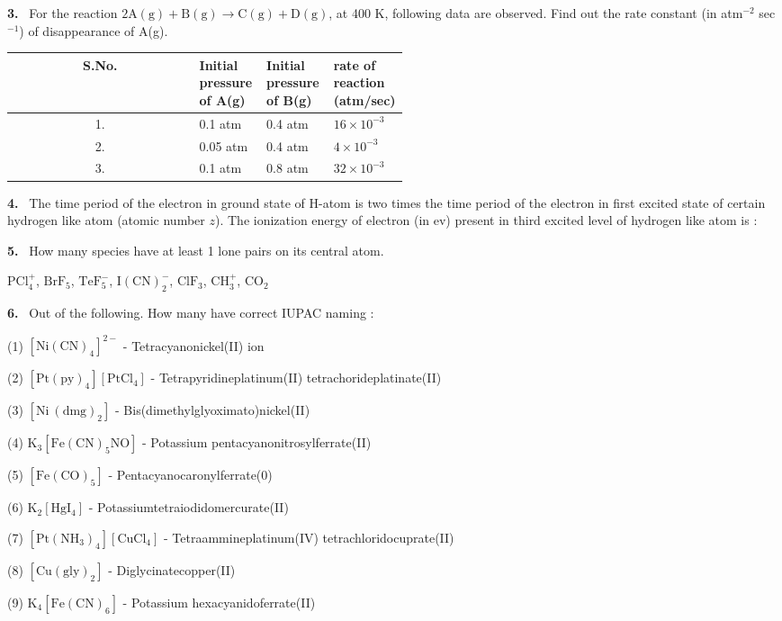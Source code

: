 \documentclass[10pt]{extarticle}
\newcommand{\qn}[1]{\par\smallskip\noindent\textbf{#1.}~}
\begin{document}
\begin{multicols}{2}
\qn{3} For the reaction $\mathrm{2A(g)+B(g)\longrightarrow C(g)+D(g)}$, at 400 K, following data are observed. Find out the rate constant (in atm$^{-2}$ sec$^{-1}$) of disappearance of A(g).\par
{\footnotesize\setlength{\tabcolsep}{3pt}\begin{tabular}{|c|p{0.17\linewidth}|p{0.17\linewidth}|p{0.17\linewidth}|}
\hline
\textbf{S.No.} & \textbf{Initial pressure of A(g)} & \textbf{Initial pressure of B(g)} & \textbf{rate of reaction (atm/sec)}\\ \hline
1. & 0.1 atm & 0.4 atm & $16\times10^{-3}$\\ \hline
2. & 0.05 atm & 0.4 atm & $4\times10^{-3}$\\ \hline
3. & 0.1 atm & 0.8 atm & $32\times10^{-3}$\\ \hline
\end{tabular}}
\qn{4} The time period of the electron in ground state of H-atom is two times the time period of the electron in first excited state of certain hydrogen like atom (atomic number $z$). The ionization energy of electron (in ev) present in third excited level of hydrogen like atom is :\par
[Given that ground state energy of electron in H-atom $=-13.6$ eV]
\qn{5} How many species have at least 1 lone pairs on its central atom.\par
$\mathrm{PCl_4^+}$, $\mathrm{BrF_5}$, $\mathrm{TeF_5^-}$, $\mathrm{I(CN)_2^-}$, $\mathrm{ClF_3}$, $\mathrm{CH_3^+}$, $\mathrm{CO_2}$
\qn{6} Out of the following. How many have correct IUPAC naming :\par
(1) $\mathrm{[Ni(CN)_4]^{2-}}$ - Tetracyanonickel(II) ion\par
(2) $\mathrm{[Pt(py)_4][PtCl_4]}$ - Tetrapyridineplatinum(II) tetrachorideplatinate(II)\par
(3) $\mathrm{[Ni\ (dmg)_2]}$ - Bis(dimethylglyoximato)nickel(II)\par
(4) $\mathrm{K_3[Fe(CN)_5NO]}$ - Potassium pentacyanonitrosylferrate(II)\par
(5) $\mathrm{[Fe(CO)_5]}$ - Pentacyanocaronylferrate(0)\par
(6) $\mathrm{K_2[HgI_4]}$ - Potassiumtetraiodidomercurate(II)\par
(7) $\mathrm{[Pt(NH_3)_4][CuCl_4]}$ - Tetraammineplatinum(IV) tetrachloridocuprate(II)\par
(8) $\mathrm{[Cu(gly)_2]}$ - Diglycinatecopper(II)\par
(9) $\mathrm{K_4[Fe(CN)_6]}$ - Potassium hexacyanidoferrate(II)\par

\end{multicols}
\end{document}
